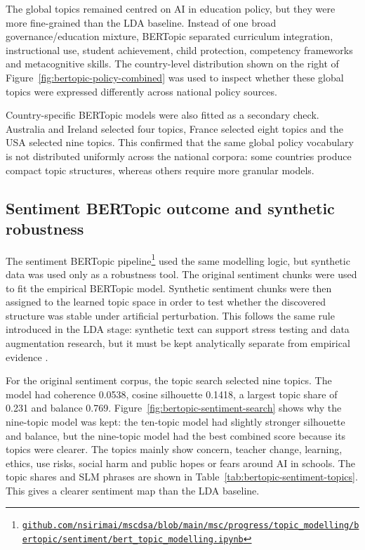 \documentclass{article}
\begin{document}
The global topics remained centred on AI in education policy, but they were more
fine-grained than the LDA baseline. Instead of one broad governance/education
mixture, BERTopic separated curriculum integration, instructional use, student
achievement, child protection, competency frameworks and metacognitive skills. The
country-level distribution shown on the right of
Figure~\ref{fig:bertopic-policy-combined} was used to inspect whether these global
topics were expressed differently across national policy sources.

Country-specific BERTopic models were also fitted as a secondary check. Australia and
Ireland selected four topics, France selected eight topics and the USA selected nine
topics. This confirmed that the same global policy vocabulary is not distributed
uniformly across the national corpora: some countries produce compact topic structures,
whereas others require more granular models.

\subsection{Sentiment BERTopic outcome and synthetic robustness}

The sentiment BERTopic
pipeline\footnote{\href{https://github.com/nsirimai/mscdsa/blob/main/msc/progress/topic_modelling/bertopic/sentiment/bert_topic_modelling.ipynb}{\texttt{github.com/nsirimai/mscdsa/blob/main/msc/progress/topic\_modelling/bertopic/sentiment/bert\_topic\_modelling.ipynb}}}
used the same modelling logic, but synthetic data was used only as a robustness tool.
The original sentiment chunks were used to fit the empirical BERTopic model.
Synthetic sentiment chunks were then assigned to the learned topic space in order to
test whether the discovered structure was stable under artificial perturbation. This
follows the same rule introduced in the LDA stage: synthetic text can support stress
testing and data augmentation research, but it must be kept analytically separate
from empirical evidence
\cite{halterman2025synthetic,chen2023empirical,chim2025evaluating}.

For the original sentiment corpus, the topic search selected nine topics. The
model had coherence 0.0538, cosine silhouette 0.1418, a largest topic share
of 0.231 and balance 0.769. Figure~\ref{fig:bertopic-sentiment-search} shows why the
nine-topic model was kept: the ten-topic model had slightly stronger silhouette
and balance, but the nine-topic model had the best combined score because its topics
were clearer. The topics mainly show concern, teacher change, learning, ethics,
use risks, social harm and public hopes or fears around AI in schools. The topic
shares and SLM phrases are shown in Table~\ref{tab:bertopic-sentiment-topics}. This
gives a clearer sentiment map than the LDA baseline.
\end{document}
